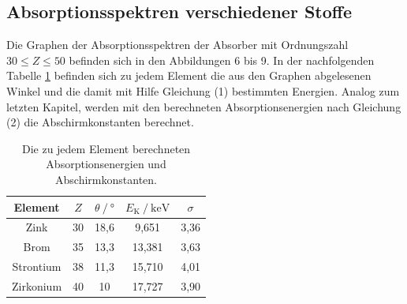 \subsection{Absorptionsspektren verschiedener Stoffe}
Die Graphen der Absorptionsspektren der Absorber 
mit Ordnungszahl $30 \leq Z \leq 50$ befinden sich in den Abbildungen 6 bis 9.
In der nachfolgenden Tabelle \ref{tab:energie2} befinden sich zu jedem Element die aus den Graphen abgelesenen Winkel
und die damit mit Hilfe Gleichung (1) bestimmten Energien.
Analog zum letzten Kapitel, werden mit den berechneten Absorptionsenergien nach Gleichung (2) die Abschirmkonstanten berechnet.

\begin{table}[H]
  \centering
  \caption{Die zu jedem Element berechneten Absorptionsenergien und Abschirmkonstanten.}
  \label{tab:energie2}
\begin{tabular}{c c c c c}
  \toprule
Element & $Z$ & $\theta \:/\: °$ & $E_\text{K}\:/\: \si{\kilo\electronvolt}$ & $\sigma$\\
\midrule
Zink & 30 & 18,6 & 9,651 & 3,36\\
Brom & 35 & 13,3 & 13,381  & 3,63\\
Strontium & 38 & 11,3 & 15,710 & 4,01\\
Zirkonium & 40 & 10 & 17,727 & 3,90\\
\bottomrule
\end{tabular}
\end{table}

